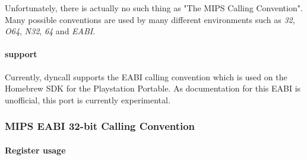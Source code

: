 Unfortunately, there is actually no such thing as "The MIPS Calling Convention".  Many possible conventions are used
by many different environments such as \emph{32}, \emph{O64}, \emph{N32}, \emph{64} and \emph{EABI}.

\paragraph{ support}

Currently, dyncall supports the EABI calling convention which is used on the Homebrew SDK for the Playstation Portable.
As documentation for this EABI is unofficial, this port is currently experimental.

\subsubsection{MIPS EABI 32-bit Calling Convention}

\paragraph{Register usage}

